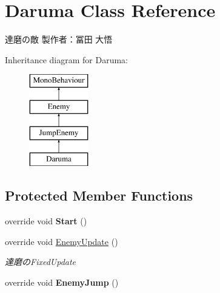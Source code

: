 \hypertarget{class_daruma}{}\section{Daruma Class Reference}
\label{class_daruma}


達磨の敵 製作者：冨田 大悟  


Inheritance diagram for Daruma\+:\begin{figure}[H]
\begin{center}
\leavevmode
\includegraphics[height=4.000000cm]{class_daruma}
\end{center}
\end{figure}
\subsection*{Protected Member Functions}
\begin{DoxyCompactItemize}
\item 
\mbox{\label{class_daruma_ae74399c128ed88847d938ddb51f44c60}} 
override void {\bfseries Start} ()
\item 
override void \hyperlink{class_daruma_aacb22dfd1f65e403acf44231e308e97c}{Enemy\+Update} ()
\begin{DoxyCompactList}\small\item\em 達磨の\+Fixed\+Update \end{DoxyCompactList}\item 
\mbox{\label{class_daruma_a5bdf01bb04f8ddf53f4c3c131512f4e9}} 
override void {\bfseries Enemy\+Jump} ()
\end{DoxyCompactItemize}
